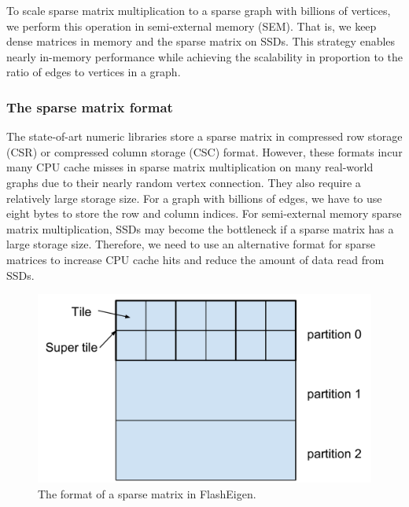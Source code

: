 To scale sparse matrix multiplication to a sparse graph with billions of vertices,
we perform this operation in semi-external memory (SEM). That is, we keep dense
matrices in memory and the sparse
matrix on SSDs. This strategy enables nearly in-memory performance while achieving
the scalability in proportion to the ratio of edges to vertices in a graph.

\subsubsection{The sparse matrix format}
The state-of-art numeric libraries store a sparse matrix in compressed row storage
(CSR) or compressed column storage (CSC) format. However, these formats incur
many CPU cache misses in sparse matrix multiplication on many real-world graphs
due to their nearly random vertex connection. They also require a relatively
large storage size. For a graph with billions of edges, we have to use eight
bytes to store the row and column indices. For semi-external memory sparse
matrix multiplication, SSDs may become the bottleneck if a sparse matrix has
a large storage size.
Therefore, we need to use an alternative format for sparse matrices to increase
CPU cache hits and reduce the amount of data read from SSDs.

\begin{figure}
\centering
\includegraphics[scale=0.3]{./sparse_mat.pdf}
\caption{The format of a sparse matrix in FlashEigen.}
\label{sparse_mat}
\end{figure}

